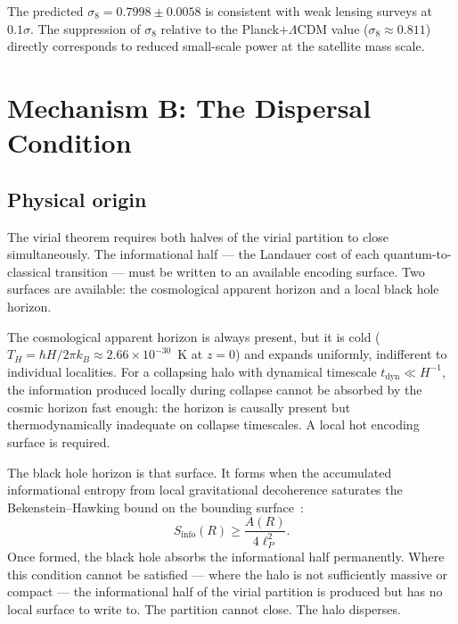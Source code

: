 \documentclass[12pt,a4paper]{article}
\begin{document}
The predicted $\sigma_8 = 0.7998 \pm 0.0058$ is consistent with weak lensing
surveys at $0.1\sigma$. The suppression of $\sigma_8$ relative to the
Planck+$\Lambda$CDM value ($\sigma_8 \approx 0.811$) directly corresponds to
reduced small-scale power at the satellite mass scale.

\section{Mechanism B: The Dispersal Condition}
\label{sec:mechB}

\subsection{Physical origin}

The virial theorem requires both halves of the virial partition to
close simultaneously. The informational half --- the Landauer cost of each
quantum-to-classical transition --- must be written to an available encoding
surface. Two surfaces are available: the cosmological apparent horizon and a
local black hole horizon.

The cosmological apparent horizon is always present, but it is cold
($T_H = \hbar H/2\pi k_B \approx 2.66 \times 10^{-30}$~K at $z = 0$) and
expands uniformly, indifferent to individual localities. For a collapsing halo
with dynamical timescale $t_\mathrm{dyn} \ll H^{-1}$, the information
produced locally during collapse cannot be absorbed by the cosmic horizon fast
enough: the horizon is causally present but thermodynamically inadequate on
collapse timescales. A local hot encoding surface is required.

The black hole horizon is that surface. It forms when the accumulated
informational entropy from local gravitational decoherence saturates the
Bekenstein--Hawking bound on the bounding surface~\citep{IAM_BH}:
\begin{equation}
S_\mathrm{info}(R) \geq \frac{A(R)}{4\ell_P^2}.
\label{eq:saturation}
\end{equation}
Once formed, the black hole absorbs the informational half permanently. Where
this condition cannot be satisfied --- where the halo is not sufficiently
massive or compact --- the informational half of the virial partition is
produced but has no local surface to write to. The partition cannot close. The
halo disperses.
\end{document}
